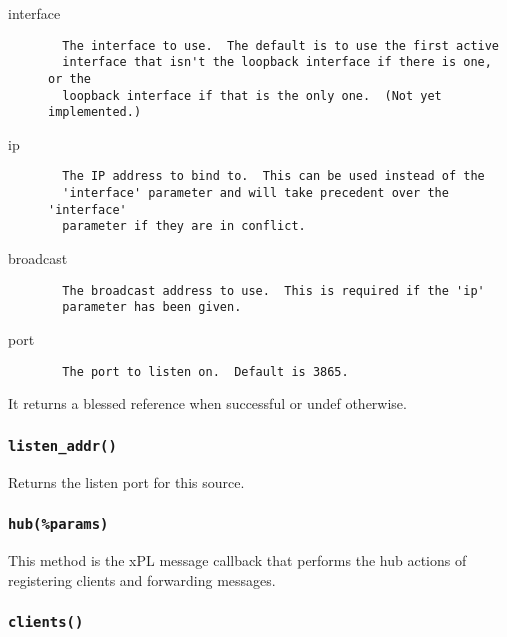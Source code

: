 \documentclass[12pt,a4paper]{article}
\begin{document}
\begin{description}

\item[{interface}] \mbox{}\begin{verbatim}
  The interface to use.  The default is to use the first active
  interface that isn't the loopback interface if there is one, or the
  loopback interface if that is the only one.  (Not yet implemented.)
\end{verbatim}

\item[{ip}] \mbox{}\begin{verbatim}
  The IP address to bind to.  This can be used instead of the
  'interface' parameter and will take precedent over the 'interface'
  parameter if they are in conflict.
\end{verbatim}

\item[{broadcast}] \mbox{}\begin{verbatim}
  The broadcast address to use.  This is required if the 'ip'
  parameter has been given.
\end{verbatim}

\item[{port}] \mbox{}\begin{verbatim}
  The port to listen on.  Default is 3865.
\end{verbatim}
\end{description}


It returns a blessed reference when successful or undef otherwise.

\subsubsection*{\texttt{listen\_addr()}\label{xPL::Hub_listen_addr_}}


Returns the listen port for this source.

\subsubsection*{\texttt{hub(\%params)}\label{xPL::Hub_hub_params_}}


This method is the xPL message callback that performs the hub actions
of registering clients and forwarding messages.

\subsubsection*{\texttt{clients()}\label{xPL::Hub_clients_}}
\end{document}
